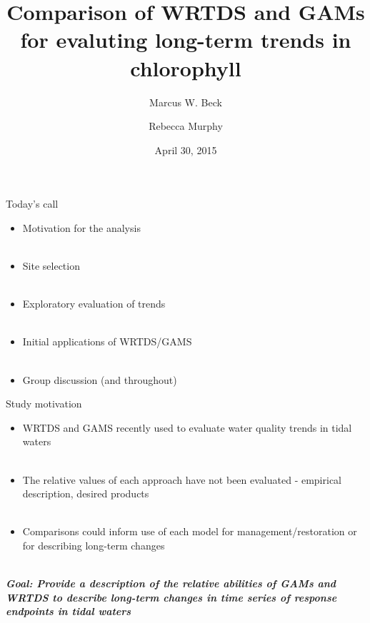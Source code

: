 \documentclass[serif]{beamer}\usepackage[]{graphicx}\usepackage[]{color}
\newcommand{\Bigtxt}[1]{\textbf{\textit{#1}}}
\begin{document}
\title[Comparison of WRTDS and GAMs]{Comparison of WRTDS and GAMs for evaluting long-term trends in chlorophyll}

\author[Beck, Murphy]{Marcus W. Beck \and Rebecca Murphy}

\date{April 30, 2015}


\begin{frame}
\titlepage
\end{frame}

\begin{frame}{Today's call}
\begin{itemize}
\item Motivation for the analysis \\~\\
\item Site selection \\~\\
\item Exploratory evaluation of trends \\~\\
\item Initial applications of WRTDS/GAMS \\~\\
\item Group discussion (and throughout) 
\end{itemize}
\end{frame}

\begin{frame}{Study motivation}
\begin{itemize}
\item WRTDS and GAMS recently used to evaluate water quality trends in tidal waters \\~\\
\item The relative values of each approach have not been evaluated - empirical description, desired products \\~\\
\item Comparisons could inform use of each model for management/restoration or for describing long-term changes \\~\\
\end{itemize}
\Bigtxt{Goal: Provide a description of the relative abilities of GAMs and WRTDS to describe long-term changes in time series of response endpoints in tidal waters}
\end{frame}
\end{document}
